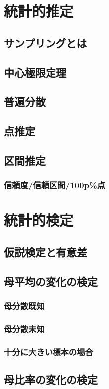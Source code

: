 \documentclass[11pt,a4paper]{jsarticle}                    %
\begin{document}
\section{統計的推定}

\subsection{サンプリングとは}
\subsection{中心極限定理}
\subsection{普遍分散}
\subsection{点推定}
\subsection{区間推定}
\subsubsection{信頼度/信頼区間/100p\%点}

\section{統計的検定}
\subsection{仮説検定と有意差}
\subsection{母平均の変化の検定}
\subsubsection{母分散既知}
\subsubsection{母分散未知}
\subsubsection{十分に大きい標本の場合}
\subsection{母比率の変化の検定}
\end{document}
